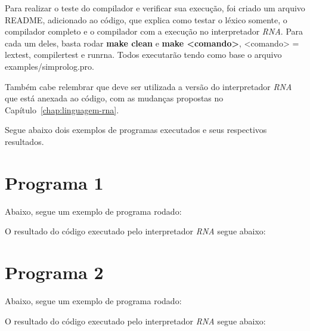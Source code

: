 
Para realizar o teste do compilador e verificar sua execução, foi criado um arquivo README, adicionado ao código, que explica como testar o léxico somente, o compilador completo e o compilador com a execução no interpretador \emph{RNA}. Para cada um deles, basta rodar \textbf{make clean} e \textbf{make <comando>}, <comando> = lextest, compilertest e runrna. Todos executarão tendo como base o arquivo examples/simprolog.pro.

Também cabe relembrar que deve ser utilizada a versão do interpretador \emph{RNA} que está anexada ao código, com as mudanças propostas no Capítulo~\ref{chap:linguagem-rna}.

Segue abaixo dois exemplos de programas executados e seus respectivos resultados.

\section{Programa 1}

Abaixo, segue um exemplo de programa rodado:



O resultado do código executado pelo interpretador \emph{RNA} segue abaixo:



\section{Programa 2}

Abaixo, segue um exemplo de programa rodado:



O resultado do código executado pelo interpretador \emph{RNA} segue abaixo:

